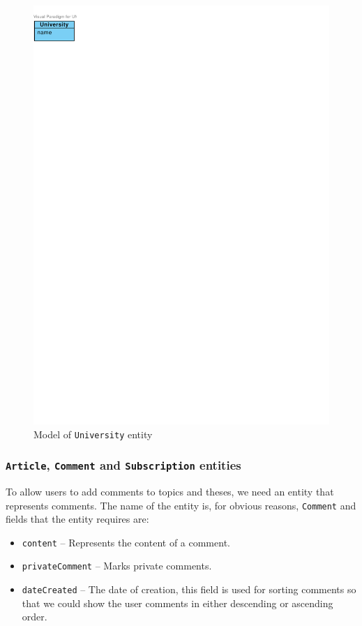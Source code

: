 \begin{figure}[h]
    \centering
        \includegraphics[trim=0 770 510 30, clip, keepaspectratio]{./images/domain-university-entity.pdf}
    \caption{Model of \texttt{University} entity}
    \label{fig:domain-university-entity}
\end{figure}

\subsubsection{\textbf{\texttt{Article}, \texttt{Comment} and \texttt{Subscription} entities}}

To allow users to add comments to topics and theses, we need an entity that represents comments. The name of the entity is, for obvious reasons, \texttt{Comment} and fields that the entity requires are:

\begin{itemize}
    \item \texttt{content} -- Represents the content of a comment.
    \item \texttt{privateComment} -- Marks private comments.
    \item \texttt{dateCreated} -- The date of creation, this field is used for sorting comments so that we could show the user comments in either descending or ascending order.
\end{itemize}

